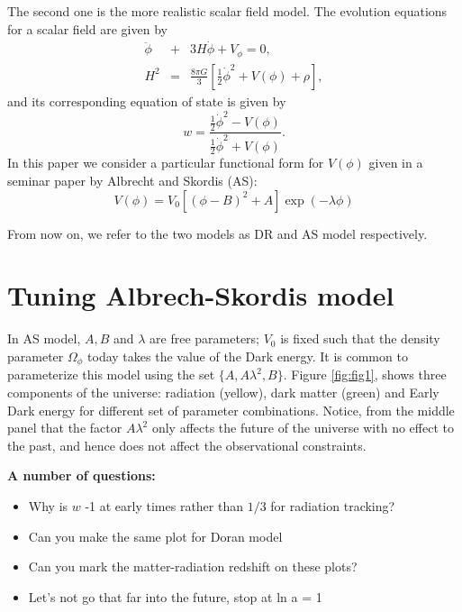 \documentclass[preprintnumbers,amsmath,amssymb,prd,superscriptaddress,notitlepag
e, twocolumn]{revtex4-1}
\begin{document}
 The second one is the more realistic scalar field model. The
 evolution equations for a scalar field are given by
 \begin{eqnarray}\label{eq:hub}
   \ddot \phi &+&3H\dot \phi + V_{\phi} = 0, \\
   H^2 &=& \frac{8\pi G}{3} \left[ \frac{1}{2}{\dot \phi}^2 + V(\phi) +\rho  \right],
 \end{eqnarray}
 and its corresponding equation of state is given by 
 \begin{equation}
   w = \frac{ \frac{1}{2}{\dot \phi}^2 -V(\phi) }{ \frac{1}{2}{\dot \phi}^2 +V(\phi)}. 
 \end{equation}
 In this paper we consider a particular functional form for $V(\phi)$
 given in a seminar paper by Albrecht and Skordis (AS):
 \begin{equation}
   V(\phi)=V_0[(\phi -B)^2+A]\exp(-\lambda \phi)
 \end{equation} 

 From now on, we refer to the two models as DR and AS model
 respectively.
 
\section*{Tuning Albrech-Skordis model}

In AS model, $A, B$ and $\lambda$ are free parameters; $V_0$ is fixed such
that the density parameter $\Omega_{\phi}$ today takes the value of
the Dark energy. It is common to parameterize this model using the set
$\{A, A\lambda^2,B\}$.  Figure \ref{fig:fig1}, shows three components of the
universe: radiation (yellow), dark matter (green) and Early Dark
energy for different set of parameter combinations.   Notice, from the
middle panel that the factor $A\lambda^2$ only affects the future of
the universe with no effect to the past, and hence does not affect the
observational constraints.

\textbf{
A number of questions:}
\begin{itemize}
\item Why is $w$ -1 at early times rather than $1/3$ for radiation
  tracking?
\item Can you make the same plot for Doran model
\item Can you mark the matter-radiation redshift on these plots?
\item Let's not go that far into the future, stop at ln a = 1
\end{itemize}
\end{document}
